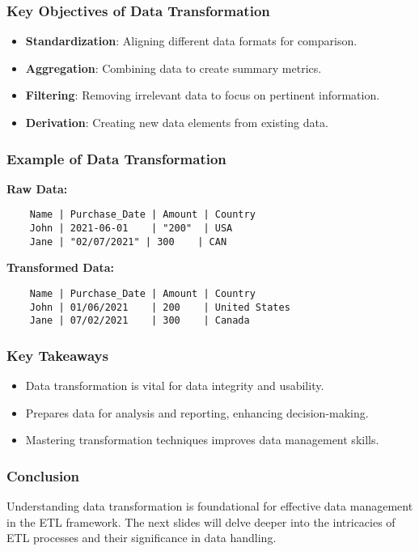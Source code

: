 \documentclass[aspectratio=169]{beamer}
\begin{document}
\begin{frame}[fragile]
    \frametitle{Key Objectives of Data Transformation}
    \begin{itemize}
        \item \textbf{Standardization}: Aligning different data formats for comparison.
        \item \textbf{Aggregation}: Combining data to create summary metrics.
        \item \textbf{Filtering}: Removing irrelevant data to focus on pertinent information.
        \item \textbf{Derivation}: Creating new data elements from existing data.
    \end{itemize}
\end{frame}

\begin{frame}[fragile]
    \frametitle{Example of Data Transformation}
    \textbf{Raw Data:}
    \begin{lstlisting}
    Name | Purchase_Date | Amount | Country
    John | 2021-06-01    | "200"  | USA
    Jane | "02/07/2021" | 300    | CAN
    \end{lstlisting}

    \textbf{Transformed Data:}
    \begin{lstlisting}
    Name | Purchase_Date | Amount | Country
    John | 01/06/2021    | 200    | United States
    Jane | 07/02/2021    | 300    | Canada
    \end{lstlisting}
\end{frame}

\begin{frame}[fragile]
    \frametitle{Key Takeaways}
    \begin{itemize}
        \item Data transformation is vital for data integrity and usability.
        \item Prepares data for analysis and reporting, enhancing decision-making.
        \item Mastering transformation techniques improves data management skills.
    \end{itemize}
\end{frame}

\begin{frame}[fragile]
    \frametitle{Conclusion}
    Understanding data transformation is foundational for effective data management in the ETL framework. The next slides will delve deeper into the intricacies of ETL processes and their significance in data handling.
\end{frame}
\end{document}

